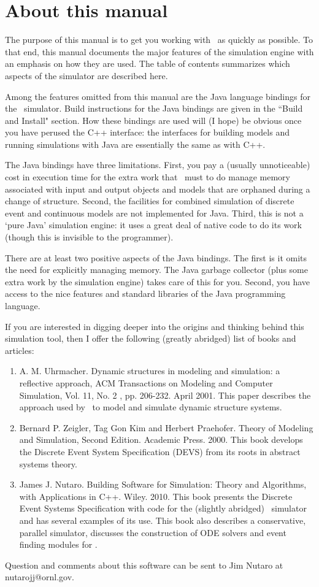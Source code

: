 \chapter{About this manual}
The purpose of this manual is to get you working with \adevs\ as quickly as possible. To that end, this manual documents the major features of the simulation engine with an emphasis on how they are used. The table of contents summarizes which aspects of the simulator are described here.

Among the features omitted from this manual are the Java language bindings for the \adevs\ simulator. Build instructions for the Java bindings are given in the ``Build and Install" section. How these bindings are used will (I hope) be obvious once you have perused the C++ interface: the interfaces for building models and running simulations with Java are essentially the same as with C++.

The Java bindings have three limitations. First, you pay a (usually unnoticeable) cost in execution time for the extra work that \adevs\ must to do manage memory associated with input and output objects and models that are orphaned during a change of structure. Second, the facilities for combined simulation of discrete event and continuous models are not implemented for Java. Third, this is not a `pure Java' simulation engine: it uses a great deal of native code to do its work (though this is invisible to the programmer).

There are at least two positive aspects of the Java bindings. The first is it omits the need for explicitly managing memory. The Java garbage collector (plus some extra work by the simulation engine) takes care of this for you. Second, you have access to the nice features and standard libraries of the Java programming language.

If you are interested in digging deeper into the origins and thinking behind this simulation tool, then I offer the following (greatly abridged) list of books and articles:
\begin{enumerate}
\item A. M. Uhrmacher. Dynamic structures in modeling and simulation: a reflective approach, ACM Transactions on Modeling and Computer Simulation, Vol. 11, No. 2 , pp. 206-232. April 2001. This paper describes the approach used by \adevs\ to model and simulate dynamic structure systems.
\item Bernard P. Zeigler, Tag Gon Kim and Herbert Praehofer. Theory of Modeling and Simulation, Second Edition. Academic Press. 2000. This book develops the Discrete Event System Specification (DEVS) from its roots in abstract systems theory.
\item James J. Nutaro. Building Software for Simulation: Theory and Algorithms, with Applications in C++. Wiley. 2010. This book presents the Discrete Event Systems Specification with code for the (slightly abridged) \adevs\ simulator and has several examples of its use. This book also describes a conservative, parallel simulator, discusses the construction of ODE solvers and event finding modules for \adevs.
\end{enumerate}
Question and comments about this software can be sent to Jim Nutaro at nutarojj@ornl.gov. 
